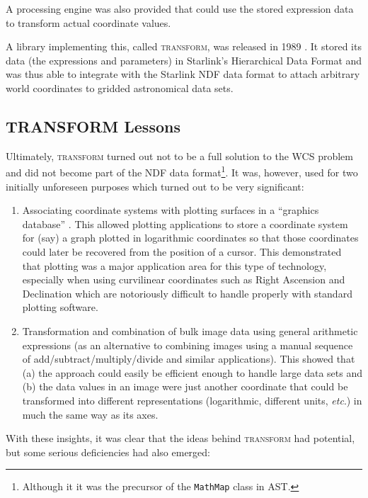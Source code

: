 \documentclass[final,authoryear,5p,times,twocolumn]{elsarticle}
\begin{document}
A processing engine was also provided that could use the stored
expression data to transform actual coordinate values.

A library implementing this, called \textsc{transform}, was released
in 1989 \citep{SUN61,1989StarB...4....7L}. It stored its data (the
expressions and parameters) in Starlink's Hierarchical Data Format
\citep[HDS;][]{SUN92,SSN27,2015HDS} and was thus able to integrate with the
Starlink NDF data format to attach arbitrary world coordinates to
gridded astronomical data sets.


\subsection{TRANSFORM Lessons}

Ultimately, \textsc{transform} turned out not to be a full solution to
the WCS problem and did not become part of the NDF data
format\footnote{Although it it was the precursor of the
  \texttt{MathMap} class in AST.}. It was, however, used for two
initially unforeseen purposes which turned out to be very significant:

\begin{enumerate}
\item Associating coordinate systems with plotting surfaces in a
  ``graphics database'' \citep[see e.g.,][]{SUN48}. This allowed
  plotting applications to store a coordinate system for (say) a graph
  plotted in logarithmic coordinates so that those coordinates could
  later be recovered from the position of a cursor. This demonstrated
  that plotting was a major application area for this type of
  technology, especially when using curvilinear coordinates such as
  Right Ascension and Declination which are notoriously difficult to
  handle properly with standard plotting software.

\item Transformation and combination of bulk image data using general
  arithmetic expressions (as an alternative to combining images using
  a manual sequence of add/subtract/multiply/divide and similar
  applications). This showed that (a) the approach could easily be
  efficient enough to handle large data sets and (b) the data values in
  an image were just another coordinate that could be transformed into
  different representations (logarithmic, different units, \emph{etc}.) in
  much the same way as its axes.
\end{enumerate}

With these insights, it was clear that the ideas behind
\textsc{transform} had potential, but some serious deficiencies had
also emerged:
\end{document}

